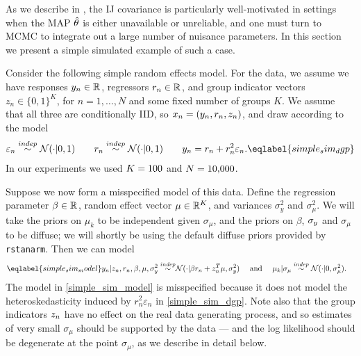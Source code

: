 As we describe in , the IJ covariance is particularly
well-motivated in settings when the MAP $\hat\theta$ is either unavailable or
unreliable, and one must turn to MCMC to integrate out a large number of
nuisance parameters.  In this section we present a simple simulated example of
such a case.

Consider the following simple random effects model. For the data,
we assume we have responses $y_n \in \mathbb{R}^{}$, regressors $r_n \in \mathbb{R}^{}$, and
group indicator vectors $z_n \in \{0, 1\}^K$, for $n=1,\ldots,N$ and some fixed
number of groups $K$.  We assume that all three are conditionally IID, so $x_n
= (y_n, r_n, z_n)$, and draw according to the model
%
\begin{align}
\varepsilon_n \indep \normdist(\cdot \vert 0, 1)
\quad\quad
r_n \indep \normdist(\cdot \vert 0, 1)
\quad\quad
y_n = r_n + r_n^2 \varepsilon_n.\eqlabel{simple_sim_dgp}
\end{align}
%
In our experiments we used $K = 100$ and $N = 10{,}000$.

Suppose we now form a misspecified model of this data. Define the regression
parameter $\beta \in \mathbb{R}^{}$, random effect vector $\mu \in \mathbb{R}^{K}$, and
variances $\sigma_y^2$ and $\sigma_\mu^2$.  We will take the priors on $\mu_k$
to be independent given $\sigma_\mu$, and the priors on $\beta$, $\sigma_y$ and
$\sigma_\mu$ to be diffuse; we will shortly be using the default diffuse priors
provided by \texttt{rstanarm}. Then we can model
%
\begin{align}\eqlabel{simple_sim_model}
%
y_n | z_n, r_n, \beta, \mu, \sigma_y^2 \indep&
    \normdist(\cdot | \beta r_n + z_n^T \mu, \sigma_y^2)
    \quad\textrm{ and }\quad
\mu_k | \sigma_\mu \indep
    \normdist(\cdot | 0, \sigma_\mu^2).
%
\end{align}
%
The model in \eqref{simple_sim_model} is misspecified because it does not model the
heteroskedasticity induced by $r_n^2 \varepsilon_n$ in \eqref{simple_sim_dgp}.
Note also that the group indicators $z_n$ have no effect on the real data
generating process, and so estimates of very small $\sigma_\mu$ should be
supported by the data --- and the log likelihood should be degenerate at the
point $\sigma_\mu$, as we describe in detail below.

